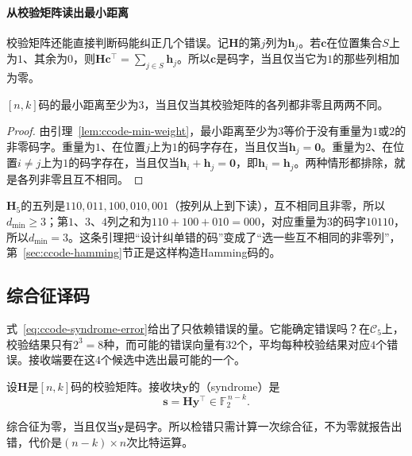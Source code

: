 \paragraph{从校验矩阵读出最小距离}
校验矩阵还能直接判断码能纠正几个错误。记$\bm{H}$的第$j$列为$\bm{h}_j$。若$\bm{c}$在位置集合$S$上为$1$、其余为$0$，则$\bm{H}\bm{c}^{\top}=\sum_{j\in S}\bm{h}_j$。所以$\bm{c}$是码字，当且仅当它为$1$的那些列相加为零。

\begin{lemma}[由校验列判断最小距离]
\label{lem:ccode-columns}
$[n,k]$码的最小距离至少为$3$，当且仅当其校验矩阵的各列都非零且两两不同。
\end{lemma}

\begin{proof}
由引理~\ref{lem:ccode-min-weight}，最小距离至少为$3$等价于没有重量为$1$或$2$的非零码字。重量为$1$、在位置$j$上为$1$的码字存在，当且仅当$\bm{h}_j=\bm{0}$。重量为$2$、在位置$i\neq j$上为$1$的码字存在，当且仅当$\bm{h}_i+\bm{h}_j=\bm{0}$，即$\bm{h}_i=\bm{h}_j$。两种情形都排除，就是各列非零且互不相同。
\end{proof}

$\bm{H}_5$的五列是$110,011,100,010,001$（按列从上到下读），互不相同且非零，所以$d_{\min}\geq3$；第$1$、$3$、$4$列之和为$110+100+010=000$，对应重量为$3$的码字$10110$，所以$d_{\min}=3$。这条引理把“设计纠单错的码”变成了“选一些互不相同的非零列”，第~\ref{sec:ccode-hamming}节正是这样构造Hamming码的。

\subsection{综合征译码}
\label{sec:ccode-syndrome}

式~\eqref{eq:ccode-syndrome-error}给出了只依赖错误的量。它能确定错误吗？在$\mathcal{C}_5$上，校验结果只有$2^{3}=8$种，而可能的错误向量有$32$个，平均每种校验结果对应$4$个错误。接收端要在这$4$个候选中选出最可能的一个。

\begin{definition}[综合征]
\label{def:ccode-syndrome}
设$\bm{H}$是$[n,k]$码的校验矩阵。接收块$\bm{y}$的（syndrome）是
\begin{equation}
 \bm{s}=\bm{H}\bm{y}^{\top}\in\mathbb{F}_2^{\,n-k} .
 \label{eq:ccode-syndrome}
\end{equation}
\end{definition}

综合征为零，当且仅当$\bm{y}$是码字。所以检错只需计算一次综合征，不为零就报告出错，代价是$(n-k)\times n$次比特运算。

